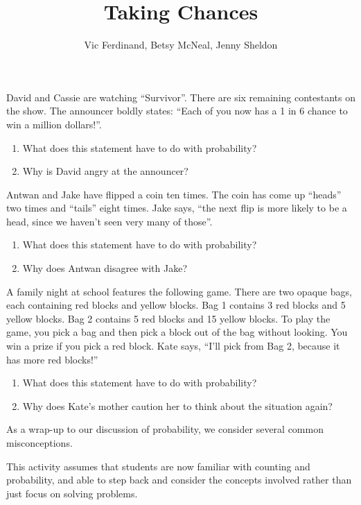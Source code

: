\documentclass[nooutcomes]{ximera}
\title{Taking Chances}
\author{Vic Ferdinand, Betsy McNeal, Jenny Sheldon}
\begin{document}
\begin{abstract}
\end{abstract}
\maketitle



\begin{problem}
David and Cassie are watching ``Survivor''.  There are six remaining contestants on the show.  The announcer boldly states: ``Each of you now has a 1 in 6 chance to win a million dollars!''.

\begin{enumerate}
\item What does this statement have to do with probability?
\item Why is David angry at the announcer?
\end{enumerate}
\end{problem}

\begin{problem}
Antwan and Jake have flipped a coin ten times.  The coin has come up ``heads'' two times and ``tails'' eight times.  Jake says, ``the next flip is more likely to be a head, since we haven't seen very many of those''.
\begin{enumerate}
\item What does this statement have to do with probability?
\item Why does Antwan disagree with Jake?
\end{enumerate}
\end{problem}

\begin{problem}
A family night at school features the following game.  There are two opaque bags, each containing red blocks and yellow blocks.  Bag 1 contains 3 red blocks and 5 yellow blocks.  Bag 2 contains 5 red blocks and 15 yellow blocks.  To play the game, you pick a bag and then pick a block out of the bag without looking.  You win a prize if you pick a red block.  Kate says, ``I'll pick from Bag 2, because it has more red blocks!''
\begin{enumerate}
\item What does this statement have to do with probability?
\item Why does Kate's mother caution her to think about the situation again?
\end{enumerate}
\end{problem}

\newpage

\begin{instructorNotes}
As a wrap-up to our discussion of probability, we consider several common misconceptions.

This activity assumes that students are now familiar with counting and probability, and able to step back and consider the concepts involved rather than just focus on solving problems.


\end{instructorNotes}
\end{document}
